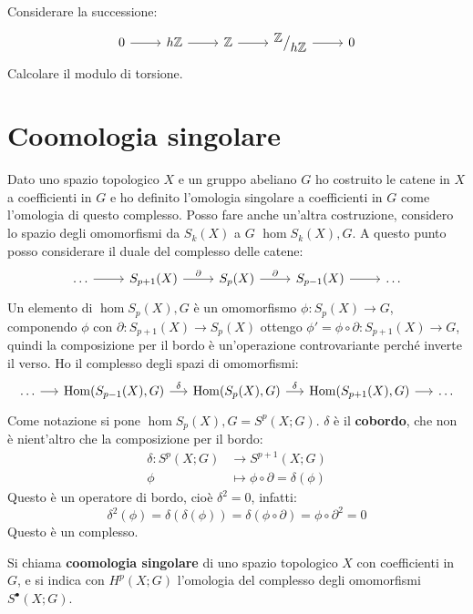  \begin{exercise}
   Considerare la successione:
   \[
     \begin{tikzcd}
       0 \rar & h \Z \rar & \Z \rar & \quot{\Z}{h \Z} \rar & 0
     \end{tikzcd}
   \]
   Calcolare il modulo di torsione.
 \end{exercise}

\section{Coomologia singolare}

Dato uno spazio topologico $ X $ e un gruppo abeliano $ G $ ho costruito le
catene in $ X $ a coefficienti in $ G $ e ho definito l'omologia singolare a
coefficienti in $ G $ come l'omologia di questo complesso. Posso fare anche un'altra
costruzione, considero lo spazio degli omomorfismi da $ S_k(X) $ a $ G $
$ \hom{S_k(X), G} $. A questo punto posso considerare il duale del complesso delle catene:
\[
  \begin{tikzcd}
    \dots \rar & S_{p+1}(X) \rar{\partial} & S_p(X) \rar{\partial} & S_{p-1}(X) \rar & \dots
  \end{tikzcd}
\]
Un elemento di $ \hom{S_p(X), G} $ è un omomorfismo $ \phi \colon S_p(X) \to G $, componendo $ \phi $
con $ \partial \colon S_{p+1}(X) \to S_p(X) $ ottengo  $ \phi' = \phi \circ \partial \colon S_{p+1}(X) \to G $, quindi la composizione
per il bordo è un'operazione controvariante perché inverte il verso. Ho il complesso degli spazi
di omomorfismi:
\[
  \begin{tikzcd}[nodes = {column sep = 14 pt}]
    \dots \rar & \hom{S_{p-1}(X),G} \rar{\delta} & \hom{S_p(X),G} \rar{\delta} & \hom{S_{p+1}(X),G} \rar & \dots
  \end{tikzcd}
\]
Come notazione si pone $ \hom{S_p(X),G} = S^p(X;G) $. $ \delta $ è il \textbf{cobordo},
che non è nient'altro che la composizione per il bordo:
\begin{align*}
  \delta \colon S^p(X;G) & \to S^{p+1}(X;G) \\
  \phi & \mapsto \phi \circ \partial = \delta(\phi)
\end{align*}
Questo è un operatore di bordo, cioè $ \delta^2 = 0 $, infatti:
\[
  \delta^2(\phi) = \delta(\delta(\phi)) = \delta (\phi \circ \partial) = \phi \circ \partial^2 = 0
\]
Questo è un complesso.
\begin{definition}
  Si chiama \textbf{coomologia singolare} di uno
  spazio topologico $ X $ con coefficienti in $ G $, e si indica con
  $ H^p(X; G) $ l'omologia del complesso degli omomorfismi $ S^\bullet(X;G) $.
\end{definition}
